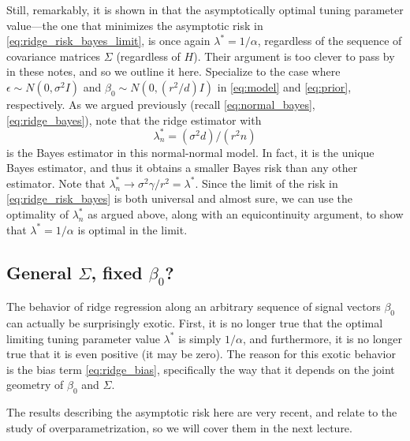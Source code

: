 \documentclass{article}
\begin{document}
Still, remarkably, it is shown in \citet{dobriban2018high} that the
asymptotically optimal tuning parameter value---the one that minimizes the 
asymptotic risk in \eqref{eq:ridge_risk_bayes_limit}, is once again $\lambda^*   
= 1/\alpha$, regardless of the sequence of covariance matrices $\Sigma$
(regardless of $H$). Their argument is too clever to pass by in these notes, and
so we outline it here. Specialize to the case where $\epsilon \sim N(0,\sigma^2
I)$ and $\beta_0 \sim N(0, (r^2/d) I)$ in \eqref{eq:model} and \eqref{eq:prior},
respectively. As we argued previously (recall \eqref{eq:normal_bayes},
\eqref{eq:ridge_bayes}), note that the ridge estimator with
\[
\lambda^*_n = (\sigma^2 d)/(r^2 n)
\]
is the Bayes estimator in this normal-normal model. In fact, it is the unique
Bayes estimator, and thus it obtains a smaller Bayes risk than any other
estimator. Note that $\lambda^*_n \to \sigma^2 \gamma / r^2= \lambda^*$. Since 
the limit of the risk in \eqref{eq:ridge_risk_bayes} is both universal and
almost sure, we can use the optimality of $\lambda^*_n$ as argued above, along
with an equicontinuity argument, to show that $\lambda^* = 1/\alpha$ is optimal
in the limit.  

\subsection{General $\Sigma$, fixed $\beta_0$?}

The behavior of ridge regression along an arbitrary sequence of signal vectors
$\beta_0$ can actually be surprisingly exotic. First, it is no longer true that
the optimal limiting tuning parameter value $\lambda^*$ is simply $1/\alpha$,
and furthermore, it is no longer true that it is even positive (it may be
zero). The reason for this exotic behavior is the bias term
\eqref{eq:ridge_bias}, specifically the way that it depends on the joint
geometry of $\beta_0$ and $\Sigma$.

The results describing the asymptotic risk here are very recent, and relate to
the study of overparametrization, so we will cover them in the next lecture.



\end{document}
